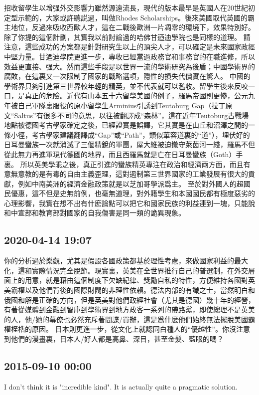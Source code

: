 \documentclass[twocolumn]{ctexart}
\begin{document}
招收留學生以增强外交影響力雖然源遠流長，現代的版本最早是英國人在20世紀初定型示範的，大家或許聽説過，叫做Rhodes Scholarships。後來美國取代英國的霸主地位，反過來吸收西歐人才，這在二戰後歐洲一片凋零的環境下，效果特別好。除了你提的這個計劃，其實我以前討論過的哈佛甘迺迪學院也是同樣的道理。
請注意，這些成功的方案都是針對研究生以上的頂尖人才，可以確定是未來國家政經中堅力量。甘迺迪學院更進一步，專收已經當過政務官和事務官的在職進修，所以效益更直接、强大。然而這些手段是以世界一流的學術研究為後盾；中國學術界的腐敗，在這裏又一次限制了國家的戰略選項，隱性的損失代價實在驚人。
中國的學術界只夠引進第三世界較年輕的精英，並不代表就可以濫收。留學生後來反咬一口，是真正的危險。近代有山本五十六留學美國的例子，羅馬帝國則更慘，公元九年被自己軍隊裏服役的原小留學生Arminius引誘到Teutoburg Gap（拉丁原文“Saltus”有很多不同的意思，以往被翻譯成“森林”，這在近年Teutoburg古戰場地點被德國考古學家確定之後，已經證實是誤譯，它其實是在山丘和沼澤之間的一條小徑，考古學家建議翻譯成“Gap”或“Path”，類似華容道裏的“道”），埋伏好的日耳曼蠻族一次就消滅了三個精銳的軍團，屋大維被迫撤守萊茵河一綫，羅馬不但從此無力再進軍現代德國的地界，而且西羅馬就是亡在日耳曼蠻族（Goth）手裏。
所以英美學乖之後，真正引進的蠻族精英專注在政治和經濟兩方面，而且有意無意教的是有毒的自由主義歪理，這對遏制第三世界國家的工業發展有很大的貢獻，例如中南美洲的經濟金融政策就是以芝加哥學派爲主。
至於對外國人的超國民優惠，這不但是史無前例，也毫無道理，對外籍學生和本國國民都有極度惡劣的心理影響，我實在想不出有什麽論點可以把它和國家民族的利益連到一塊，只能說和中宣部和教育部對國家的自我傷害是同一類的詭異現象。
\subsection*{2020-04-14 19:07}

你的分析過於樂觀，尤其是假設各國政策都基於理性考慮，來做國家利益的最大化，這和實際情況完全脫節。現實裏，英美在全世界推行自己的普選制，在外交層面上的用意，就是藉由這個制度下欠缺紀律、獎勵自私的特性，方便維持各國對英美霸權以及他們背後的國際財閥的非理性依賴。德法内部的有識之士，當然明白和俄國和解是正確的方向，但是英美對他們政經社會（尤其是德國）幾十年的經營，有著從媒體到金融到智庫到學術界到地方政客一系列的帶路黨，即使總理不是英美的人，他/她的幕僚也必然充斥著間諜/買辦，這是爲什麽他們始終無法擺脫美國霸權桎梏的原因。
日本則更進一步，從文化上就認同白種人的“優越性”。你沒注意到他們的漫畫裏，日本人/好人都是高鼻、深目，甚至金髮、藍眼的嗎？
\subsection*{2015-09-10 00:00}
I don't think it is "incredible kind". It is actually quite a pragmatic solution.
\end{document}
